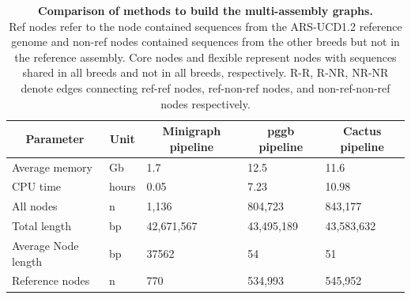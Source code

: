 \documentclass[../main.tex]{subfiles}
\begin{document}
\begin{table}[!htb]
   \begin{center}
   \small
   \caption[Comparison of methods to build the multi-assembly graphs]{\textbf{Comparison of methods to build the multi-assembly graphs.} \\
   \footnotesize{Ref nodes refer to the node contained sequences from the ARS-UCD1.2 reference genome and non-ref nodes contained sequences from the other breeds but not in the reference assembly. Core nodes and flexible represent nodes with sequences shared in all breeds and not in all breeds, respectively. R-R, R-NR, NR-NR denote edges connecting ref-ref nodes, ref-non-ref nodes, and non-ref-non-ref nodes respectively.}}
   \vspace{1em}
   \begin{tabular}{|l|l|l|l|l|} 
   \hline
   \multicolumn{1}{|c|}{\textbf{Parameter}} & \multicolumn{1}{c|}{\textbf{Unit}} & \multicolumn{1}{c|}{\textbf{Minigraph pipeline}} & \multicolumn{1}{c|}{\textbf{pggb pipeline}} & \multicolumn{1}{c|}{\textbf{Cactus pipeline}}  \\ 
   \hline
   Average memory                            & Gb                                & 1.7                                            & 12.5                                     & 11.6                                         \\ 
   \hline
   CPU time                                   & hours                           & 0.05                                           & 7.23                                      & 10.98                                         \\ 
   \hline
   All nodes                                 & n                                  & 1,136                                            & 804,723                                     & 843,177                                        \\ 
   \hline
   Total length                              & bp                                 & 42,671,567                                       & 43,495,189                                  & 43,583,632                                     \\ 
   \hline
   Average Node length                       & bp                                 & 37562                                            & 54                                          & 51                                             \\ 
   \hline
   Reference nodes                           & n                                  & 770                                              & 534,993                                     & 545,952                                        \\ 

\end{tabular}
\end{center}
\end{table}
\end{document}
